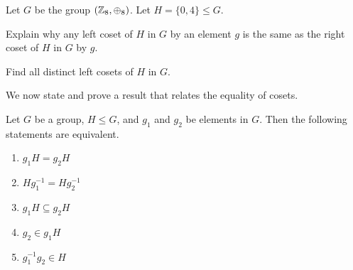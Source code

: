 \begin{exercise}
    Let $G$ be the group $(\mathbb{Z}_8, \oplus_8)$. Let $H = \{0, 4\} \leq G$.
    \begin{partquestions}{\alph*}
        \item Explain why any left coset of $H$ in $G$ by an element $g$ is the same as the right coset of $H$ in $G$ by $g$.
        \item Find all distinct left cosets of $H$ in $G$.
    \end{partquestions}
\end{exercise}

\newpage

We now state and prove a result that relates the equality of cosets.
\begin{lemma}\label{lemma-coset-equality}
    Let $G$ be a group, $H \leq G$, and $g_1$ and $g_2$ be elements in $G$. Then the following statements are equivalent.
    \begin{enumerate}[label=$(\arabic*)$]
        \item $g_1H = g_2H$
        \item $Hg_1^{-1} = Hg_2^{-1}$
        \item $g_1H \subseteq g_2H$
        \item $g_2 \in g_1H$
        \item $g_1^{-1}g_2 \in H$
    \end{enumerate}
\end{lemma}
